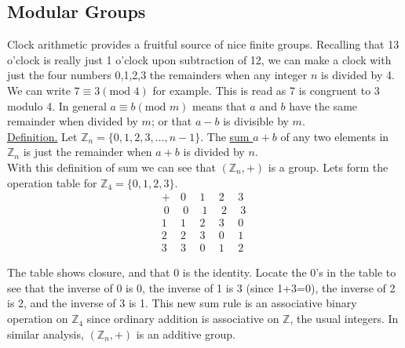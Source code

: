 \documentclass[12pt]{book}
\theoremstyle{definition}
\def\Z{\mathbb{Z}}
\begin{document}
\subsection{Modular Groups}
Clock arithmetic provides a fruitful source of nice finite groups.  Recalling that 13 o'clock is really just 1 o'clock upon subtraction of 12, we can make a clock with just the four numbers 0,1,2,3 the remainders when any integer $n$ is divided by 4. We can write $7\equiv3(\text{mod }4)$ for example.  This is read as 7 is congruent to 3 modulo 4.  In general $a\equiv b(\text{mod }m)$ means that $a$ and $b$ have the same remainder when divided by $m$; or that $a-b$ is divisible by $m$.\\[.2in]
%
\underline{Definition.}  Let $\Z_n=\{0,1,2,3,\dots, n-1\}$.  The \underline{sum $a+b$}  of any two elements in $\Z_n$ is just the remainder when $a+b$ is divided by $n$. \\[.2in]
 With this definition of sum we can see that $(\Z_n,+)$ is a group.  Lets form the operation table for $\Z_4=\{0,1,2,3\}$.
$$\begin{array}{c|cccc}
+ & 0 & 1& 2 & 3\\
\hline
~0~ & ~0~ & ~1~ & ~2~ & ~3~\\
1 & 1 & 2 & 3 & 0\\
2 & 2 & 3 & 0 & 1\\
3 & 3 & 0 & 1 & 2
\end{array}$$

The table shows closure, and that 0 is the identity.  Locate the 0's in the table to see that the inverse of 0 is 0, the inverse of 1 is 3 (since 1+3=0), the inverse of 2 is 2, and the inverse of 3 is 1.  This new sum rule is an associative binary operation on $\Z_4$ since ordinary addition is associative on $\Z$, the usual integers.  In similar analysis, $(\Z_n,+)$ is an additive group.\\
\end{document}
